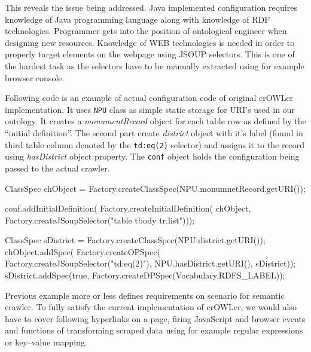 This reveals the issue being addressed. Java implemented configuration requires
knowledge of Java programming language along with knowledge of RDF
technologies. Programmer gets into the position of ontological engineer when
designing new resources. Knowledge of WEB technologies is needed in order to
properly target elements on the webpage using JSOUP selectors. This is one of
the hardest task as the selectors have to be manually extracted using for
example browser console. 

Following code is an example of actual configuration code of original crOWLer
implementation.  It uses {\tt NPU} class as simple static storage for URI's
used in our ontology. It creates a {\em monumentRecord} object for each table
row as defined by the ``initial definition''. The second part create {\em
district} object with it's label (found in third table column denoted by the
{\tt td:eq(2)} selector) and assigns it to the record using {\em hasDistrict}
object property. The {\tt conf} object holds the configuration being passed to
the actual crawler. 

\begtt
ClassSpec chObject = Factory.createClassSpec(NPU.monumnetRecord.getURI());

conf.addInitialDefinition(
       Factory.createInitialDefinition(
         chObject,
         Factory.createJSoupSelector("table tbody tr.list")));

ClassSpec sDistrict = Factory.createClassSpec(NPU.district.getURI());
chObject.addSpec(
           Factory.createOPSpec(
             Factory.createJSoupSelector("td:eq(2)"),
                                         NPU.hasDistrict.getURI(),
                                         sDistrict));
sDistrict.addSpec(true, Factory.createDPSpec(Vocabulary.RDFS_LABEL));
\endtt

Previous example more or less defines requirements on scenario for semantic
crawler. To fully satisfy the current implementation of crOWLer, we would also
have to cover following hyperlinks on a page, firing JavaScript and browser
events and functions of transforming scraped data using for example regular
expressions or key--value mapping. 

